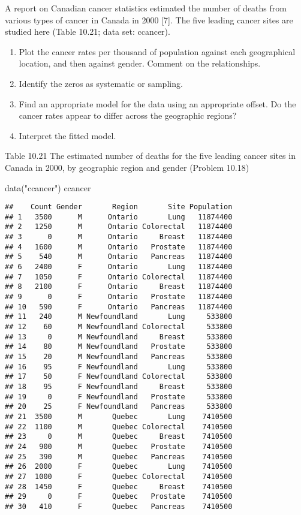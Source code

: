\documentclass[
]{article}
\newenvironment{Shaded}{\begin{snugshade}}{\end{snugshade}}
\newcommand{\FunctionTok}[1]{\textcolor[rgb]{0.00,0.00,0.00}{#1}}
\newcommand{\NormalTok}[1]{#1}
\newcommand{\StringTok}[1]{\textcolor[rgb]{0.31,0.60,0.02}{#1}}
\providecommand{\tightlist}{%
  \setlength{\itemsep}{0pt}\setlength{\parskip}{0pt}}
\begin{document}
A report on Canadian cancer statistics estimated the number of deaths
from various types of cancer in Canada in 2000 {[}7{]}. The ﬁve leading
cancer sites are studied here (Table 10.21; data set: ccancer).

\begin{enumerate}
\def\labelenumi{\arabic{enumi}.}
\tightlist
\item
  Plot the cancer rates per thousand of population against each
  geographical location, and then against gender. Comment on the
  relationships.
\item
  Identify the zeros as systematic or sampling.
\item
  Find an appropriate model for the data using an appropriate oﬀset. Do
  the cancer rates appear to diﬀer across the geographic regions?
\item
  Interpret the ﬁtted model.
\end{enumerate}

Table 10.21 The estimated number of deaths for the ﬁve leading cancer
sites in Canada in 2000, by geographic region and gender (Problem 10.18)

\begin{Shaded}
\begin{Highlighting}[]
\FunctionTok{data}\NormalTok{(}\StringTok{"ccancer"}\NormalTok{)}
\NormalTok{ccancer}
\end{Highlighting}
\end{Shaded}

\begin{verbatim}
##    Count Gender       Region       Site Population
## 1   3500      M      Ontario       Lung   11874400
## 2   1250      M      Ontario Colorectal   11874400
## 3      0      M      Ontario     Breast   11874400
## 4   1600      M      Ontario   Prostate   11874400
## 5    540      M      Ontario   Pancreas   11874400
## 6   2400      F      Ontario       Lung   11874400
## 7   1050      F      Ontario Colorectal   11874400
## 8   2100      F      Ontario     Breast   11874400
## 9      0      F      Ontario   Prostate   11874400
## 10   590      F      Ontario   Pancreas   11874400
## 11   240      M Newfoundland       Lung     533800
## 12    60      M Newfoundland Colorectal     533800
## 13     0      M Newfoundland     Breast     533800
## 14    80      M Newfoundland   Prostate     533800
## 15    20      M Newfoundland   Pancreas     533800
## 16    95      F Newfoundland       Lung     533800
## 17    50      F Newfoundland Colorectal     533800
## 18    95      F Newfoundland     Breast     533800
## 19     0      F Newfoundland   Prostate     533800
## 20    25      F Newfoundland   Pancreas     533800
## 21  3500      M       Quebec       Lung    7410500
## 22  1100      M       Quebec Colorectal    7410500
## 23     0      M       Quebec     Breast    7410500
## 24   900      M       Quebec   Prostate    7410500
## 25   390      M       Quebec   Pancreas    7410500
## 26  2000      F       Quebec       Lung    7410500
## 27  1000      F       Quebec Colorectal    7410500
## 28  1450      F       Quebec     Breast    7410500
## 29     0      F       Quebec   Prostate    7410500
## 30   410      F       Quebec   Pancreas    7410500
\end{verbatim}
\end{document}
